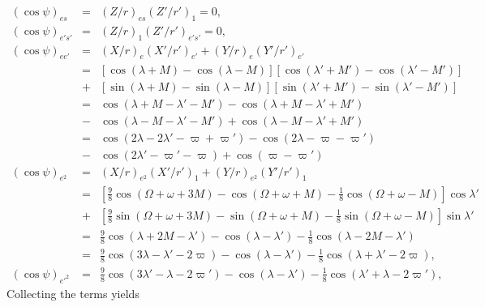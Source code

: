 \documentclass [12pt, a4paper] {article}
\begin{document}
\begin {eqnarray}
    (\cos\psi)_{es}
    &=&
    (Z/r)_{es}(Z'/r')_1 = 0,
    \\
    (\cos\psi)_{e's'}
    &=&
    (Z/r)_{1}(Z'/r')_{e's'} = 0,
    \\
    (\cos\psi)_{ee'} 
    &=& 
    (X/r)_{e}(X'/r')_{e'} + (Y/r)_{e}(Y'/r')_{e'}
    \\
    &=&
    \left[\cos(\lambda + M) - \cos(\lambda - M)\right]
    \left[\cos(\lambda' + M') - \cos(\lambda' - M')\right]
    \\\nonumber 
    &+&
    \left[\sin(\lambda + M) - \sin(\lambda - M)\right]
    \left[\sin(\lambda' + M') - \sin(\lambda' - M')\right]
    \\
    &=& 
    \cos(\lambda + M - \lambda' - M')
    -
    \cos(\lambda + M - \lambda' + M')
    \\\nonumber
    &-&
    \cos(\lambda - M - \lambda' - M')
    +
    \cos(\lambda - M - \lambda' + M')
    \\
    &=&
    \cos(2\lambda - 2\lambda' - \varpi + \varpi')
    -
    \cos(2\lambda - \varpi - \varpi')
    \\\nonumber
    &-&
    \cos(2\lambda' - \varpi' - \varpi)
    +
    \cos(\varpi - \varpi')
    \\
    (\cos\psi)_{e^2} 
    &=& 
    (X/r)_{e^2}(X'/r')_1 + (Y/r)_{e^2}(Y'/r')_1
    \\
    &=&
    \left[
        \frac{9}{8}\cos(\Omega + \omega + 3M)
        -
        \cos(\Omega + \omega + M)
        - 
        \frac{1}{8}\cos(\Omega + \omega - M)
    \right]\cos \lambda' 
    \\\nonumber 
    &+&
    \left[
        \frac{9}{8}\sin(\Omega + \omega + 3M)
        -
        \sin(\Omega + \omega + M)
        -
        \frac{1}{8}\sin(\Omega + \omega - M)
    \right]\sin\lambda'
    \\
    &=& 
    \frac{9}{8}\cos(\lambda + 2M - \lambda')
    -
    \cos(\lambda - \lambda')
    -
    \frac{1}{8}\cos(\lambda - 2M - \lambda')
    \\
    &=&
    \frac{9}{8}\cos(3\lambda - \lambda' - 2\varpi)
    -
    \cos(\lambda - \lambda')
    -
    \frac{1}{8}\cos(\lambda + \lambda' - 2\varpi),
    \\
    (\cos\psi)_{e'^2} 
    &=&
    \frac{9}{8}\cos(3\lambda' - \lambda - 2\varpi')
    -
    \cos(\lambda - \lambda')
    -
    \frac{1}{8}\cos(\lambda' + \lambda - 2\varpi'),
\end {eqnarray}
Collecting the terms yields
\end{document}
